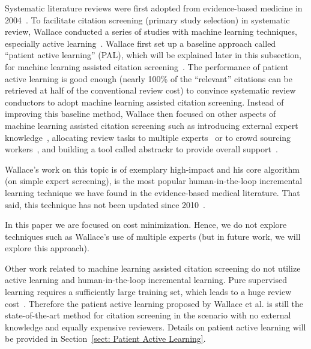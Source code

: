 \documentclass[final,twocolumn,5p]{elsarticle}
\theoremstyle{break}
\begin{document}
Systematic literature reviews were first adopted from evidence-based medicine in
2004~\cite{kitchenham2004evidence}. To facilitate citation screening (primary
study selection) in systematic review, Wallace conducted a series of studies
with machine learning techniques, especially active
learning~\cite{wallace2010semi,wallace2010active,wallace2011should,wallace2012deploying,wallace2013active,wallace2013modernizing,nguyen2015combining}. Wallace
first set up a baseline approach called ``patient active learning'' (PAL), which will be explained later in this subsection, for machine learning assisted citation
screening~\cite{wallace2010semi}. The performance of patient active learning
is good enough (nearly 100\% of the ``relevant''
citations can be retrieved at half of the conventional review cost) to convince
systematic review conductors to adopt machine learning assisted citation
screening. Instead of improving this baseline method, Wallace then focused on other aspects of machine learning assisted citation screening such as introducing external expert knowledge~\cite{wallace2010active}, allocating review tasks to multiple experts~\cite{wallace2011should} or to crowd sourcing workers~\cite{nguyen2015combining}, and building a tool called abstrackr to provide overall support~\cite{wallace2012deploying}. 

Wallace's work on this topic is of  
exemplary high-impact and
 his core algorithm   (on simple expert screening),   is   the most
popular human-in-the-loop incremental learning technique we have found in the
evidence-based medical literature. That said,
this technique has not been updated   since 2010~\cite{wallace2010semi}.

In this paper we are focused on cost minimization. Hence, we do not explore
techniques such as Wallace's use of multiple experts (but in future work,
we will explore this approach).

Other work related to machine learning assisted citation screening do not
utilize active learning and human-in-the-loop incremental learning. Pure supervised learning
requires a sufficiently large training set, which leads to a huge review
cost~\cite{cohen2006reducing, adeva2014automatic}. Therefore the patient active
learning proposed by Wallace et al. is still the state-of-the-art method for
citation screening in the scenario with no external knowledge and equally
expensive reviewers. Details on patient active learning will be provided in Section~\ref{sect: Patient Active Learning}.
\end{document}

